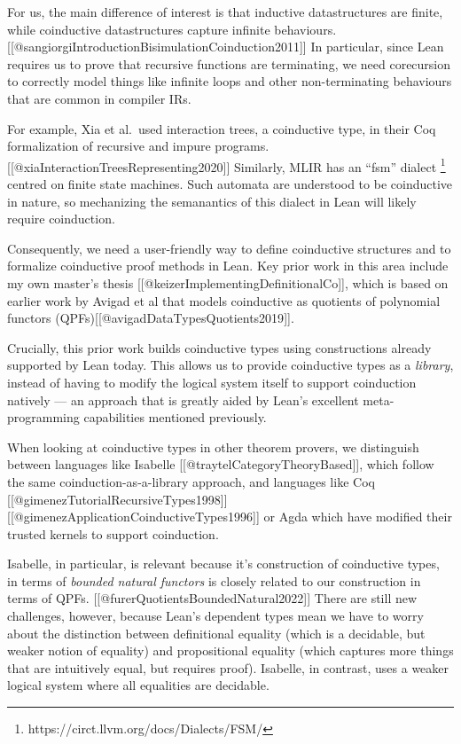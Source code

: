 For us, the main difference of interest is that inductive datastructures
are finite, while coinductive datastructures capture infinite
behaviours.
{[}{[}@sangiorgiIntroductionBisimulationCoinduction2011{]}{]} In
particular, since Lean requires us to prove that recursive functions are
terminating, we need corecursion to correctly model things like infinite
loops and other non-terminating behaviours that are common in compiler
IRs.

For example, Xia et al.~used interaction trees, a coinductive type, in
their Coq formalization of recursive and impure programs.
{[}{[}@xiaInteractionTreesRepresenting2020{]}{]} Similarly, MLIR has an
``fsm'' dialect \footnote{https://circt.llvm.org/docs/Dialects/FSM/}
centred on finite state machines. Such automata are understood to be
coinductive in nature, so mechanizing the semanantics of this dialect in
Lean will likely require coinduction.

Consequently, we need a user-friendly way to define coinductive
structures and to formalize coinductive proof methods in Lean. Key prior
work in this area include my own master's thesis
{[}{[}@keizerImplementingDefinitionalCo{]}{]}, which is based on earlier
work by Avigad et al that models coinductive as quotients of polynomial
functors (QPFs){[}{[}@avigadDataTypesQuotients2019{]}{]}.

Crucially, this prior work builds coinductive types using constructions
already supported by Lean today. This allows us to provide coinductive
types as a \emph{library}, instead of having to modify the logical
system itself to support coinduction natively --- an approach that is
greatly aided by Lean's excellent meta-programming capabilities
mentioned previously.

When looking at coinductive types in other theorem provers, we
distinguish between languages like Isabelle
{[}{[}@traytelCategoryTheoryBased{]}{]}, which follow the same
coinduction-as-a-library approach, and languages like Coq
{[}{[}@gimenezTutorialRecursiveTypes1998{]}{]}{[}{[}@gimenezApplicationCoinductiveTypes1996{]}{]}
or Agda which have modified their trusted kernels to support
coinduction.

Isabelle, in particular, is relevant because it's construction of
coinductive types, in terms of \emph{bounded natural functors} is
closely related to our construction in terms of QPFs.
{[}{[}@furerQuotientsBoundedNatural2022{]}{]} There are still new
challenges, however, because Lean's dependent types mean we have to
worry about the distinction between definitional equality (which is a
decidable, but weaker notion of equality) and propositional equality
(which captures more things that are intuitively equal, but requires
proof). Isabelle, in contrast, uses a weaker logical system where all
equalities are decidable.

